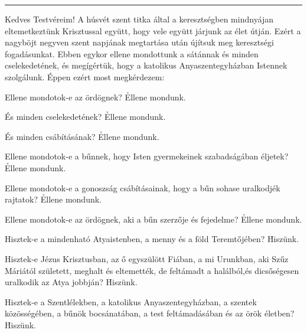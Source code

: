 \documentclass[twoside]{article}
\begin{document}
\noindent\textcolor{red}{\rule{\linewidth}{0.5pt}}



\p Kedves Testvéreim! A húsvét szent titka által a keresztségben mindnyájan eltemetkeztünk Krisztussal
együtt, hogy vele együtt járjunk az élet útján. Ezért a nagyböjt negyven szent napjának megtartása
után újítsuk meg keresztségi fogadásunkat. Ebben egykor ellene mondottunk a sátánnak és minden
cselekedetének, és megígértük, hogy a katolikus Anyaszentegyházban Istennek szolgálunk. Éppen ezért
most megkérdezem:

\p Ellene mondotok-e az ördögnek? \h Ellene mondunk.

\p És minden cselekedetének? \h Ellene mondunk.

\p És minden csábításának? \h Ellene mondunk.


\p Ellene mondotok-e a bűnnek, hogy Isten gyermekeinek szabadságában éljetek? \h Ellene mondunk.

\p Ellene mondotok-e a gonoszság csábításainak, hogy a bűn sohase uralkodjék rajtatok? \h Ellene mondunk.

\p Ellene mondotok-e az ördögnek, aki a bűn szerzője és fejedelme? \h Ellene mondunk.


\p Hisztek-e a mindenható Atyaistenben, a menny és a föld Teremtőjében? \h Hi\-szünk.

\p Hisztek-e Jézus Krisztusban, az ő egyszülött Fiában, a mi Urunkban, aki Szűz Máriától született,
meghalt és eltemették, de feltámadt a halálból,és dicsőségesen uralkodik az Atya jobbján? \h
Hiszünk.

\p Hisztek-e a Szentlélekben, a katolikus Anyaszentegyházban, a szentek közössé\-gében, a bűnök
bocsánatában, a test feltámadásában és az örök életben? \h Hi\-szünk.


\end{document}
